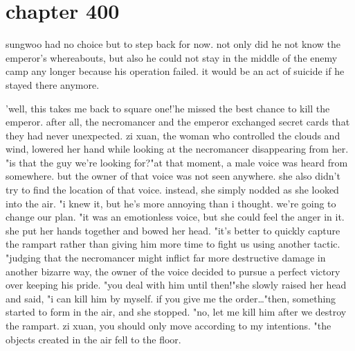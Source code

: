 \section{chapter 400}

sungwoo had no choice but to step back for now.
 not only did he not know the emperor's whereabouts, but also he could not stay in the middle of the enemy camp any longer because his operation failed.
 it would be an act of suicide if he stayed there anymore.





'well, this takes me back to square one!'he missed the best chance to kill the emperor.
after all, the necromancer and the emperor exchanged secret cards that they had never unexpected.
zi xuan, the woman who controlled the clouds and wind, lowered her hand while looking at the necromancer disappearing from her.
"is that the guy we're looking for?"at that moment, a male voice was heard from somewhere.
 but the owner of that voice was not seen anywhere.
she also didn't try to find the location of that voice.
 instead, she simply nodded as she looked into the air.
"i knew it, but he's more annoying than i thought.
 we're going to change our plan.
"it was an emotionless voice, but she could feel the anger in it.
 she put her hands together and bowed her head.
"it's better to quickly capture the rampart rather than giving him more time to fight us using another tactic.
"judging that the necromancer might inflict far more destructive damage in another bizarre way, the owner of the voice decided to pursue a perfect victory over keeping his pride.
"you deal with him until then!"she slowly raised her head and said, "i can kill him by myself.
 if you give me the order…"then, something started to form in the air, and she stopped.
"no, let me kill him after we destroy the rampart.
 zi xuan, you should only move according to my intentions.
"the objects created in the air fell to the floor.

